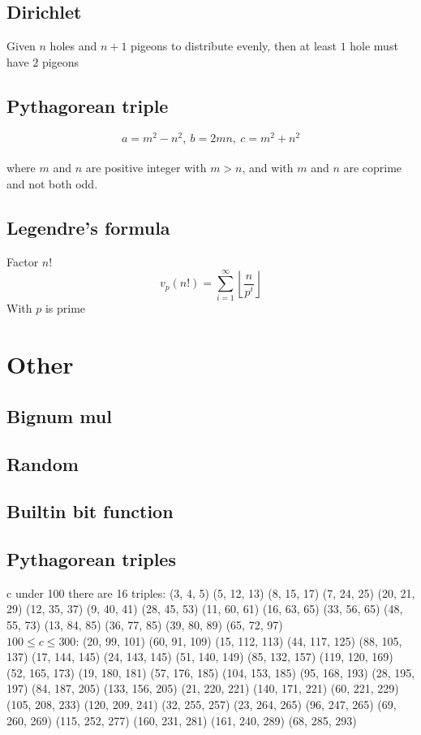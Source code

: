 \documentclass[A4 paper, 12pt, oneside]{article}
\begin{document}
\begin{landscape}
\begin{multicols}{2}
	\subsection{Dirichlet}
	Given $n$ holes and $n + 1$ pigeons to distribute evenly, then at least $1$ hole must have $2$ pigeons
	
	\subsection{Pythagorean triple}
	\[a = m^2 - n^2, \ b = 2mn, \ c = m^2 + n^2 \] \\
	where $m$ and $n$ are positive integer with $m > n$, and with $m$ and $n$ are coprime and not both odd.
	
	\subsection{Legendre's formula}
	Factor $n!$
	\[v_p(n!) = \sum_{i = 1}^{\infty} \left \lfloor \frac{n}{p ^ i} \right \rfloor \]
	With $p$ is prime

\section{Other}
	\subsection{Bignum mul}
	
	
	\subsection{Random}
	
	
	\subsection{Builtin bit function}
	
	
	\subsection{Pythagorean triples}
	c under 100 there are 16 triples:
	(3, 4, 5)	(5, 12, 13)	(8, 15, 17)	(7, 24, 25)
(20, 21, 29)	(12, 35, 37)	(9, 40, 41)	(28, 45, 53)
(11, 60, 61)	(16, 63, 65)	(33, 56, 65)	(48, 55, 73)
(13, 84, 85)	(36, 77, 85)	(39, 80, 89)	(65, 72, 97) \\

	$100 \leq c \leq 300$:
	(20, 99, 101)	(60, 91, 109)	(15, 112, 113)	(44, 117, 125)
(88, 105, 137)	(17, 144, 145)	(24, 143, 145)	(51, 140, 149)
(85, 132, 157)	(119, 120, 169)	(52, 165, 173)	(19, 180, 181)
(57, 176, 185)	(104, 153, 185)	(95, 168, 193)	(28, 195, 197)
(84, 187, 205)	(133, 156, 205)	(21, 220, 221)	(140, 171, 221)
(60, 221, 229)	(105, 208, 233)	(120, 209, 241)	(32, 255, 257)
(23, 264, 265)	(96, 247, 265)	(69, 260, 269)	(115, 252, 277)
(160, 231, 281)	(161, 240, 289)	(68, 285, 293)


\end{multicols}
\end{landscape}
\end{document}
